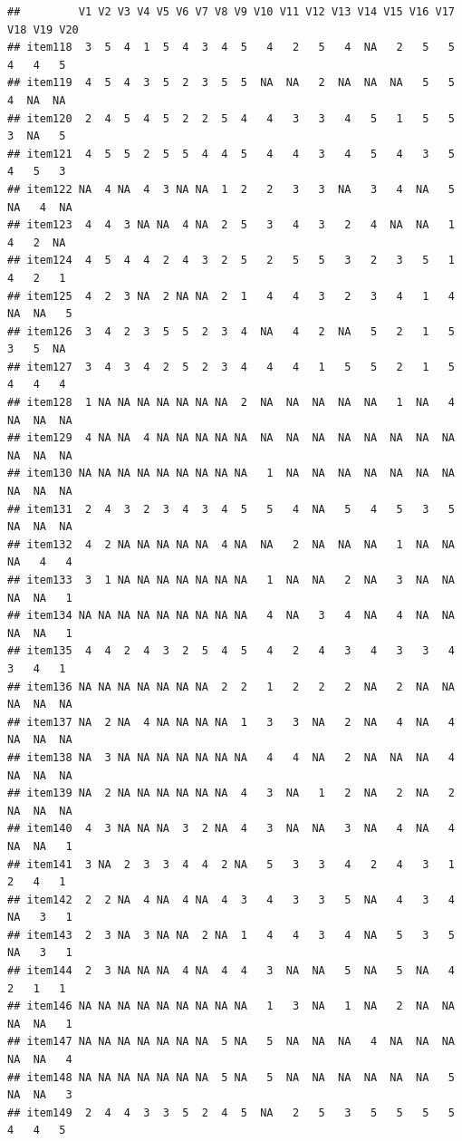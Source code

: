 \documentclass[
  man]{apa6}
\begin{document}
\begin{verbatim}
##         V1 V2 V3 V4 V5 V6 V7 V8 V9 V10 V11 V12 V13 V14 V15 V16 V17 V18 V19 V20
## item118  3  5  4  1  5  4  3  4  5   4   2   5   4  NA   2   5   5   4   4   5
## item119  4  5  4  3  5  2  3  5  5  NA  NA   2  NA  NA  NA   5   5   4  NA  NA
## item120  2  4  5  4  5  2  2  5  4   4   3   3   4   5   1   5   5   3  NA   5
## item121  4  5  5  2  5  5  4  4  5   4   4   3   4   5   4   3   5   4   5   3
## item122 NA  4 NA  4  3 NA NA  1  2   2   3   3  NA   3   4  NA   5  NA   4  NA
## item123  4  4  3 NA NA  4 NA  2  5   3   4   3   2   4  NA  NA   1   4   2  NA
## item124  4  5  4  4  2  4  3  2  5   2   5   5   3   2   3   5   1   4   2   1
## item125  4  2  3 NA  2 NA NA  2  1   4   4   3   2   3   4   1   4  NA  NA   5
## item126  3  4  2  3  5  5  2  3  4  NA   4   2  NA   5   2   1   5   3   5  NA
## item127  3  4  3  4  2  5  2  3  4   4   4   1   5   5   2   1   5   4   4   4
## item128  1 NA NA NA NA NA NA NA  2  NA  NA  NA  NA  NA   1  NA   4  NA  NA  NA
## item129  4 NA NA  4 NA NA NA NA NA  NA  NA  NA  NA  NA  NA  NA  NA  NA  NA  NA
## item130 NA NA NA NA NA NA NA NA NA   1  NA  NA  NA  NA  NA  NA  NA  NA  NA  NA
## item131  2  4  3  2  3  4  3  4  5   5   4  NA   5   4   5   3   5  NA  NA  NA
## item132  4  2 NA NA NA NA NA  4 NA  NA   2  NA  NA  NA   1  NA  NA  NA   4   4
## item133  3  1 NA NA NA NA NA NA NA   1  NA  NA   2  NA   3  NA  NA  NA  NA   1
## item134 NA NA NA NA NA NA NA NA NA   4  NA   3   4  NA   4  NA  NA  NA  NA   1
## item135  4  4  2  4  3  2  5  4  5   4   2   4   3   4   3   3   4   3   4   1
## item136 NA NA NA NA NA NA NA  2  2   1   2   2   2  NA   2  NA  NA  NA  NA  NA
## item137 NA  2 NA  4 NA NA NA NA  1   3   3  NA   2  NA   4  NA   4  NA  NA  NA
## item138 NA  3 NA NA NA NA NA NA NA   4   4  NA   2  NA  NA  NA   4  NA  NA  NA
## item139 NA  2 NA NA NA NA NA NA  4   3  NA   1   2  NA   2  NA   2  NA  NA  NA
## item140  4  3 NA NA NA  3  2 NA  4   3  NA  NA   3  NA   4  NA   4  NA  NA   1
## item141  3 NA  2  3  3  4  4  2 NA   5   3   3   4   2   4   3   1   2   4   1
## item142  2  2 NA  4 NA  4 NA  4  3   4   3   3   5  NA   4   3   4  NA   3   1
## item143  2  3 NA  3 NA NA  2 NA  1   4   4   3   4  NA   5   3   5  NA   3   1
## item144  2  3 NA NA NA  4 NA  4  4   3  NA  NA   5  NA   5  NA   4   2   1   1
## item146 NA NA NA NA NA NA NA NA NA   1   3  NA   1  NA   2  NA  NA  NA  NA   1
## item147 NA NA NA NA NA NA NA  5 NA   5  NA  NA  NA   4  NA  NA  NA  NA  NA   4
## item148 NA NA NA NA NA NA NA  5 NA   5  NA  NA  NA  NA  NA  NA   5  NA  NA   3
## item149  2  4  4  3  3  5  2  4  5  NA   2   5   3   5   5   5   5   4   4   5

\end{verbatim}
\end{document}
